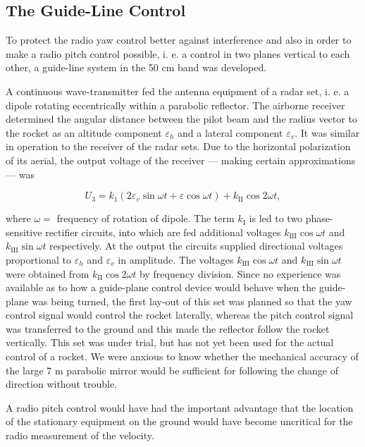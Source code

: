 \documentclass[12pt, a4paper]{article}
\begin{document}
\subsection{The Guide-Line Control}

To protect the radio yaw control better against interference and also in order to make a radio pitch control possible, i. e. a control in two planes vertical to each other, a guide-line system in the 50 cm band was developed.

A continuous wave-transmitter fed the antenna equipment of a radar set, i. e.
a dipole rotating eccentrically within a parabolic reflector. The airborne
receiver determined the angular distance between the pilot beam and the radius
vector to the rocket as an altitude component $\varepsilon_{h}$ and a lateral component $\varepsilon_{v}$. It was similar in operation to the receiver of the radar sets. Due to the horizontal polarization of its aerial, the output voltage of the receiver — making certain approximations — was

\begin{equation}
  U_{3}=k_{1}(2\varepsilon_{v}\sin{\omega t}+\varepsilon\cos{\omega t})+k_{\text{II}}\cos{2\omega t},
\end{equation}

where $\omega=$ frequency of rotation of dipole. The term $k_{\text{I}}$ is led to two phase- sensitive rectifier circuits, into which are fed additional voltages $k_{\text{III}}\cos{\omega t}$ and  $k_{\text{III}}\sin{\omega t}$ respectively. At the output the circuits supplied directional voltages proportional to $\varepsilon_{h}$ and $\varepsilon_{v}$ in amplitude. The voltages $k_{\text{III}}\cos{\omega t}$ and $k_{\text{III}}\sin{\omega t}$ were obtained from $k_{\text{II}}\cos{2\omega t}$  by frequency division. Since no experience was available as to how a guide-plane control device would behave when the guide-plane was being turned, the first lay-out of this set was planned so that the yaw control signal would control the rocket laterally, whereas the pitch control signal was transferred to the ground and this made the reflector follow the rocket vertically. This set was under trial, but has not yet been used for the actual control of a rocket. We were anxious to know whether the mechanical accuracy of the large 7 m parabolic mirror would be sufficient for following the change of direction without trouble.

A radio pitch control would have had the important advantage that the location of the stationary equipment on the ground would have become uncritical for the radio measurement of the velocity.
\end{document}
